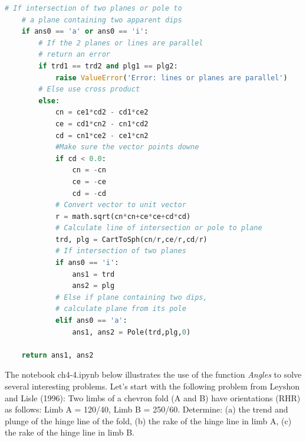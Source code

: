 \documentclass[a4paper , 12pt]{book}
\begin{document}
\begin{center}
\begin{lstlisting}[language=Python, frame=single]
    # If intersection of two planes or pole to 
    # a plane containing two apparent dips
    if ans0 == 'a' or ans0 == 'i':
        # If the 2 planes or lines are parallel 
        # return an error
        if trd1 == trd2 and plg1 == plg2:
            raise ValueError('Error: lines or planes are parallel')
        # Else use cross product
        else:
            cn = ce1*cd2 - cd1*ce2
            ce = cd1*cn2 - cn1*cd2
            cd = cn1*ce2 - ce1*cn2
            #Make sure the vector points downe
            if cd < 0.0:
                cn = -cn
                ce = -ce
                cd = -cd
            # Convert vector to unit vector
            r = math.sqrt(cn*cn+ce*ce+cd*cd)
            # Calculate line of intersection or pole to plane
            trd, plg = CartToSph(cn/r,ce/r,cd/r)
            # If intersection of two planes
            if ans0 == 'i':
                ans1 = trd
                ans2 = plg
            # Else if plane containing two dips, 
            # calculate plane from its pole
            elif ans0 == 'a':
                ans1, ans2 = Pole(trd,plg,0)
    
    return ans1, ans2
\end{lstlisting}    
\end{center}

The notebook ch4-4.ipynb below illustrates the use of the function \textit{Angles} to solve several interesting problems. Let's start with the following problem from Leyshon and Lisle (1996): Two limbs of a chevron fold (A and B) have orientations (RHR) as follows: Limb A = 120/40, Limb B = 250/60. Determine: (a) the trend and plunge of the hinge line of the fold, (b) the rake of the hinge line in limb A, (c) the rake of the hinge line in limb B. 
\end{document}
